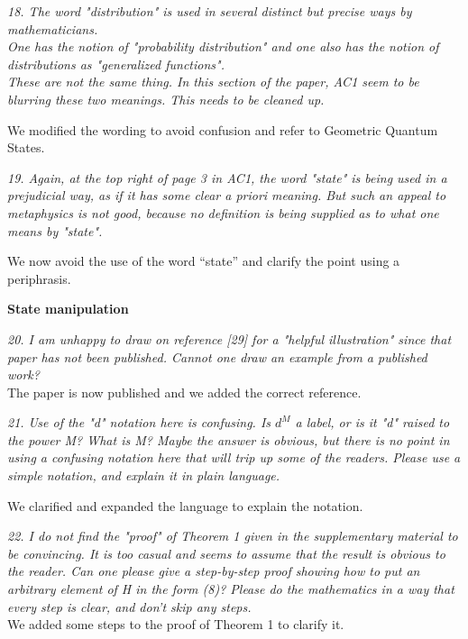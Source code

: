 \documentclass{article}
\newcommand{\REVIEW}[1]{{ \it \textcolor{reviewblack}{#1}}}
\newcommand{\REPLY}[1]{\textcolor{UCDBlue}{#1}}
\begin{document}
\REVIEW{18. The word "distribution" is used in several distinct but precise ways by mathematicians.}\\

\REVIEW{One has the notion of "probability distribution" and one also has the notion of distributions as "generalized functions".}\\

\REVIEW{These are not the same thing. In this section of the paper, AC1 seem to be blurring these two meanings. This needs to be cleaned up.}

\REPLY{We modified the wording to avoid confusion and refer to Geometric Quantum States.}

\REVIEW{19. Again, at the top right of page 3 in AC1, the word "state" is being used in a prejudicial way, as if it has some clear a priori meaning. But such an appeal to metaphysics is not good, because no definition is being supplied as to what one means by "state".}

\REPLY{We now avoid the use of the word ``state'' and clarify the point using a periphrasis.}

{\bf State manipulation}

\REVIEW{20. I am unhappy to draw on reference [29] for a "helpful illustration" since that paper has not been published. Cannot one draw an example from a published work?}\\

\REPLY{The paper is now published and we added the correct reference.}

\REVIEW{21. Use of the "d" notation here is confusing. Is $d^M$ a label, or is it "d" raised to the power M? What is M? Maybe the answer is obvious, but there is no point in using a confusing notation here that will trip up some of the readers. Please use a simple notation, and explain it in plain language.}

\REPLY{We clarified and expanded the language to explain the notation. }

\REVIEW{22. I do not find the "proof" of Theorem 1 given in the supplementary material to be convincing. It is too casual and seems to assume that the result is obvious to the reader. Can one please give a step-by-step proof showing how to put an arbitrary element of H in the form (8)? Please do the mathematics in a way that every step is clear, and don't skip any steps.}\\

\REPLY{We added some steps to the proof of Theorem 1 to clarify it.}
\end{document}
